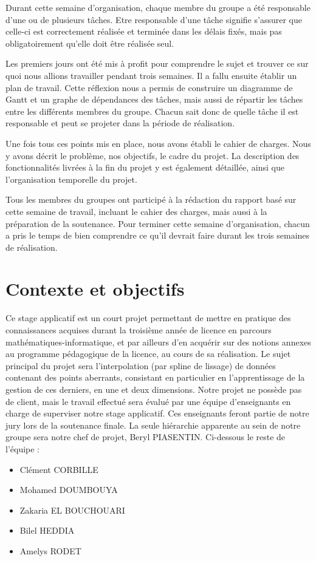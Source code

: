 \documentclass[a4paper,12pt]{article} %
\begin{document}
Durant cette semaine d'organisation, chaque membre du groupe a été responsable d’une ou de plusieurs tâches. Etre responsable d'une tâche signifie s'assurer que celle-ci est correctement réalisée et terminée dans les délais fixés, mais pas obligatoirement qu'elle doit être réalisée seul.

Les premiers jours ont été mis à profit pour comprendre le sujet et trouver ce sur quoi nous allions travailler pendant trois semaines. Il a fallu ensuite établir un plan de travail. Cette réflexion nous a permis de construire un diagramme de Gantt et un graphe de dépendances des tâches, mais aussi de répartir les tâches entre les différents membres du groupe. Chacun sait donc de quelle tâche il est responsable et peut se projeter dans la période de réalisation.

Une fois tous ces points mis en place, nous avons établi le cahier de charges. Nous y avons décrit le problème, nos objectifs, le cadre du projet. La description des fonctionnalités livrées à la fin du projet y est également détaillée, ainsi que l'organisation temporelle du projet. 

Tous les membres du groupes ont participé à la rédaction du rapport basé sur cette semaine de travail, incluant le cahier des charges, mais aussi à la préparation de la soutenance. Pour terminer cette semaine d'organisation, chacun a pris le temps de bien comprendre ce qu'il devrait faire durant les trois semaines de réalisation. 


\newpage
\section{Contexte et objectifs}
Ce stage applicatif est un court projet permettant de mettre en pratique des connaissances acquises durant la troisième année de licence en parcours mathématiques-informatique, et par ailleurs d’en acquérir sur des notions annexes au programme pédagogique de la licence, au cours de sa réalisation. Le sujet principal du projet sera l’interpolation (par spline de lissage) de données contenant des points aberrants, consistant en particulier en l'apprentissage de la gestion de ces derniers, en une et deux dimensions.
Notre projet ne possède pas de client, mais le  travail effectué sera évalué par une équipe d’enseignants en charge de superviser notre stage applicatif. Ces enseignants feront partie de notre jury lors de la soutenance finale. La seule hiérarchie apparente au sein de notre groupe sera notre chef de projet, Beryl PIASENTIN. Ci-dessous le reste de l’équipe :
\begin{itemize}
\item Clément CORBILLE 
\item Mohamed DOUMBOUYA
\item Zakaria EL BOUCHOUARI
\item Bilel HEDDIA
\item Amelys RODET
\end{itemize}
\end{document}
